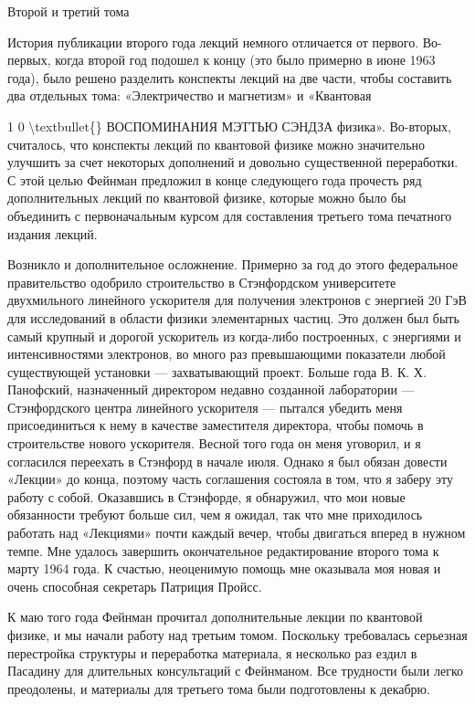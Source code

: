 \documentclass[10pt,oneside]{article}
\begin{document}
Второй и третий тома\par

История публикации второго года лекций немного отличается от первого. Во-первых, когда второй год подошел к концу (это было примерно в июне 1963 года), было решено разделить конспекты лекций на две части, чтобы составить два отдельных тома: «Электричество и магнетизм» и «Квантовая\par

1 0 \textbackslash{}textbullet\{\} ВОСПОМИНАНИЯ МЭТТЬЮ СЭНДЗА физика». Во-вторых, считалось, что конспекты лекций по квантовой физике можно значительно улучшить за счет некоторых дополнений и довольно существенной переработки. С этой целью Фейнман предложил в конце следующего года прочесть ряд дополнительных лекций по квантовой физике, которые можно было бы объединить с первоначальным курсом для составления третьего тома печатного издания лекций.\par

Возникло и дополнительное осложнение. Примерно за год до этого федеральное правительство одобрило строительство в Стэнфордском университете двухмильного линейного ускорителя для получения электронов с энергией 20 ГэВ для исследований в области физики элементарных частиц. Это должен был быть самый крупный и дорогой ускоритель из когда-либо построенных, с энергиями и интенсивностями электронов, во много раз превышающими показатели любой существующей установки --- захватывающий проект. Больше года В. К. Х. Панофский, назначенный директором недавно созданной лаборатории --- Стэнфордского центра линейного ускорителя --- пытался убедить меня присоединиться к нему в качестве заместителя директора, чтобы помочь в строительстве нового ускорителя. Весной того года он меня уговорил, и я согласился переехать в Стэнфорд в начале июля. Однако я был обязан довести «Лекции» до конца, поэтому часть соглашения состояла в том, что я заберу эту работу с собой. Оказавшись в Стэнфорде, я обнаружил, что мои новые обязанности требуют больше сил, чем я ожидал, так что мне приходилось работать над «Лекциями» почти каждый вечер, чтобы двигаться вперед в нужном темпе. Мне удалось завершить окончательное редактирование второго тома к марту 1964 года. К счастью, неоценимую помощь мне оказывала моя новая и очень способная секретарь Патриция Пройсс.\par

К маю того года Фейнман прочитал дополнительные лекции по квантовой физике, и мы начали работу над третьим томом. Поскольку требовалась серьезная перестройка структуры и переработка материала, я несколько раз ездил в Пасадину для длительных консультаций с Фейнманом. Все трудности были легко преодолены, и материалы для третьего тома были подготовлены к декабрю.\par
\end{document}
